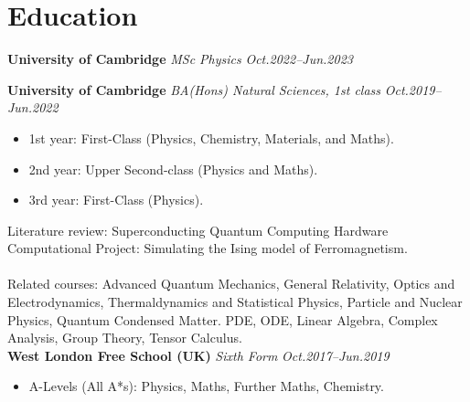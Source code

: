 \documentclass[11pt,a4paper,roman]{moderncv}        %
\begin{document}
\makecvtitle

\section{Education}

\textbf{University of Cambridge} \textit{MSc Physics} \hfill \textit{Oct.2022--Jun.2023}
\vspace*{1mm}

\vspace*{3mm}


\textbf{University of Cambridge} \textit{BA(Hons) Natural Sciences, 1st class} \hfill \textit{Oct.2019--Jun.2022}
\vspace*{1mm}
\begin{itemize}
    \item 1st year: First-Class (Physics, Chemistry, Materials, and Maths).
    \item 2nd year: Upper Second-class (Physics and Maths).
    \item 3rd year: First-Class (Physics).
\end{itemize}
\vspace*{3mm}
Literature review: Superconducting Quantum Computing Hardware\\
Computational Project: Simulating the Ising model of Ferromagnetism.\\
\\
Related courses: Advanced Quantum Mechanics, General Relativity, Optics and Electrodynamics, Thermaldynamics and Statistical Physics,
Particle and Nuclear Physics, Quantum Condensed Matter. PDE, ODE, Linear Algebra, Complex Analysis, Group Theory, Tensor Calculus.\\


\textbf{West London Free School (UK)} \textit{Sixth Form} \hfill \textit{Oct.2017--Jun.2019}
\vspace*{1mm}
\begin{itemize}
\item{A-Levels (All A*s): Physics, Maths, Further Maths, Chemistry.}
\end{itemize}
\vspace*{3mm}
\end{document}
